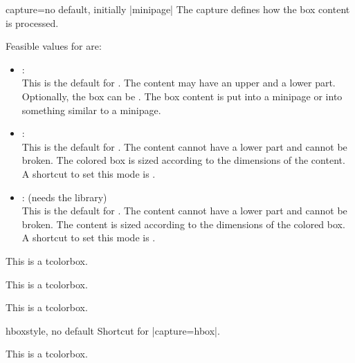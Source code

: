 \begin{docTcbKey}{capture}{=}{no default, initially |minipage|}
  The capture  defines how the box content is processed.

Feasible values for  are:
\begin{itemize}
\item{}:\\
  This is the default  for .
  The content may have an upper and a lower part. Optionally, the box
  can be . The box content is put into a
  minipage or into something similar to a minipage.
\item{}:\\
  This is the default  for . The content cannot have
  a lower part and cannot be broken. The colored box is sized according
  to the dimensions of the content.
  A shortcut to set this mode is .
\item{}: (needs the  library)\\
  This is the default  for . The content cannot have
  a lower part and cannot be broken.
  The content is sized according to the dimensions of the colored box.
  A shortcut to set this mode is .
\end{itemize}

\begin{dispExample}

\begin{tcolorbox}[capture=minipage]
This is a tcolorbox.
\end{tcolorbox}

\begin{tcolorbox}[capture=hbox]
This is a tcolorbox.
\end{tcolorbox}

\begin{tcolorbox}[capture=fitbox,height=9mm]%
This is a tcolorbox.
\end{tcolorbox}
\end{dispExample}
\end{docTcbKey}



\begin{docTcbKey}{hbox}{}{style, no default}
  Shortcut for |capture=hbox|.
\begin{dispExample}

\begin{tcolorbox}[hbox]
This is a tcolorbox.
\end{tcolorbox}
\end{dispExample}
\end{docTcbKey}


